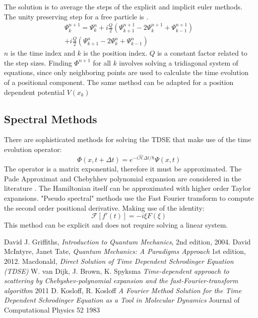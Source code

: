 \documentclass[twoside,twocolumn]{article}
\begin{document}
The solution is to average the steps of the explicit and implicit euler methods.
The unity preserving step for a free particle is \cite{q3}.
\begin{equation}
	\begin{split}
	\Psi_{k}^{n+1} = \Psi_{k}^{n} + i\frac{Q}{2}(\Psi_{k+1}^{n+1}
	 - 2\Psi_{k}^{n+1} + \Psi_{k-1}^{n+1}) \\
	 + i\frac{Q}{2}(\Psi_{k+1}^{n}
	 - 2\Psi_{k}^{n} + \Psi_{k-1}^{n})  
 \end{split}
\end{equation}
$n$ is the time index and $k$ is the position index. $Q$ is a constant factor related to the step sizes. Finding $\Phi^{n+1}$ for all $k$ involves solving a tridiagonal system of equations, since only neighboring points are used to calculate the time evolution of a positional component. The same method can be adapted for a position dependent potential $V(x_k)$
\subsection{Spectral Methods}
There are sophisticated methods for solving the TDSE that make use of the time evolution operator:
\begin{equation}
\Phi(x,t + \Delta t) = e^{- i\hat{\mathcal{H}} \Delta {t} /\hbar}\Psi(x,t)
\end{equation}
The operator is a matrix exponential, therefore  it must be approximated. The Pade Approximat and Chebyhhev polynomial expansion are considered in the literature \cite{q4}. The Hamiltonian itself can be approximated with higher order Taylor expansions. "Pseudo spectral" methods use the Fast Fourier transform to compute the second order positional derivative.\cite{q5} Making use of the identity:
\begin{equation}
	\mathscr{F}[f'(t)] = - i \xi F(\xi)
\end{equation}
This method can be explicit and does not require solving a linear system.
\begin{thebibliography}{9}

  David J. Griffiths,
  \textit{Introduction to Quantum Mechanics},
  2nd edition,
  2004.
David McIntyre, Janet Tate,
\textit{Quantum Mechanics: A Paradigms Approach}
1st edition,
2012.
Macdonald,
\textit{Direct Solution of Time Dependent Schrodinger Equation (TDSE)}
W. van Dijk, J. Brown, K. Spyksma
\textit{Time-dependent approach to scattering by Chebyshev-polynomial expansion and the fast-Fourier-transform algorithm} 
2011
D. Kosloff, R. Kosloff
\textit{A Fourier Method Solution for the Time Dependent Schrodinger Equation as a Tool in Molecular Dynamics}
Journal of Computational Physics 52 1983


\end{thebibliography}
\end{document}
